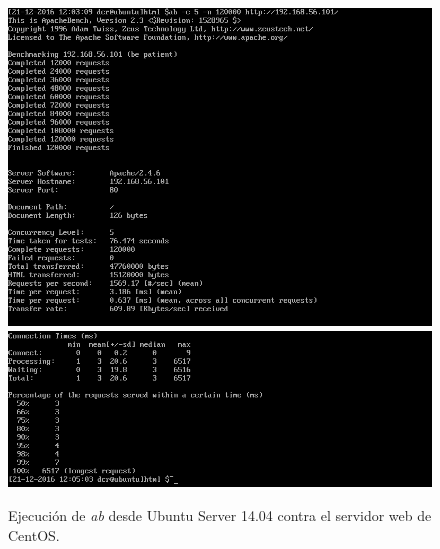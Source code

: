 \begin{figure}[H]
	\centering
	\includegraphics[scale=0.6]{abCentOS1.png}
	\includegraphics[scale=0.6]{abCentOS2.png}
	\caption{Ejecución de \textit{ab} desde Ubuntu Server 14.04 contra el servidor web de CentOS.}
\end{figure}

